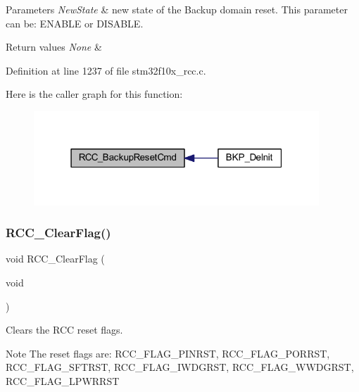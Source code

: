 \begin{DoxyParams}{Parameters}
{\em New\+State} & new state of the Backup domain reset. This parameter can be\+: E\+N\+A\+B\+LE or D\+I\+S\+A\+B\+LE. \\
\hline
\end{DoxyParams}

\begin{DoxyRetVals}{Return values}
{\em None} & \\
\hline
\end{DoxyRetVals}


Definition at line 1237 of file stm32f10x\+\_\+rcc.\+c.

Here is the caller graph for this function\+:
\nopagebreak
\begin{figure}[H]
\begin{center}
\leavevmode
\includegraphics[width=304pt]{group___r_c_c___exported___functions_ga636c3b72f35391e67f12a551b15fa54a_icgraph}
\end{center}
\end{figure}
\mbox{\label{group___r_c_c___exported___functions_ga53f909dbb15a54124419084ebda97d72}} 
\subsubsection{\texorpdfstring{R\+C\+C\+\_\+\+Clear\+Flag()}{RCC\_ClearFlag()}}
{\footnotesize\ttfamily void R\+C\+C\+\_\+\+Clear\+Flag (\begin{DoxyParamCaption}\item[{void}]{ }\end{DoxyParamCaption})}



Clears the R\+CC reset flags. 

\begin{DoxyNote}{Note}
The reset flags are\+: R\+C\+C\+\_\+\+F\+L\+A\+G\+\_\+\+P\+I\+N\+R\+ST, R\+C\+C\+\_\+\+F\+L\+A\+G\+\_\+\+P\+O\+R\+R\+ST, R\+C\+C\+\_\+\+F\+L\+A\+G\+\_\+\+S\+F\+T\+R\+ST, R\+C\+C\+\_\+\+F\+L\+A\+G\+\_\+\+I\+W\+D\+G\+R\+ST, R\+C\+C\+\_\+\+F\+L\+A\+G\+\_\+\+W\+W\+D\+G\+R\+ST, R\+C\+C\+\_\+\+F\+L\+A\+G\+\_\+\+L\+P\+W\+R\+R\+ST 
\end{DoxyNote}

